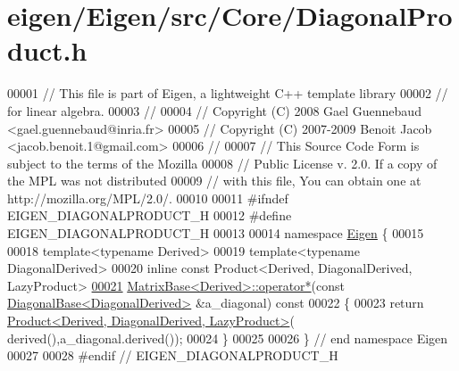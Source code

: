 \hypertarget{eigen_2_eigen_2src_2_core_2_diagonal_product_8h_source}{}\section{eigen/\+Eigen/src/\+Core/\+Diagonal\+Product.h}
\label{eigen_2_eigen_2src_2_core_2_diagonal_product_8h_source}

\begin{DoxyCode}
00001 \textcolor{comment}{// This file is part of Eigen, a lightweight C++ template library}
00002 \textcolor{comment}{// for linear algebra.}
00003 \textcolor{comment}{//}
00004 \textcolor{comment}{// Copyright (C) 2008 Gael Guennebaud <gael.guennebaud@inria.fr>}
00005 \textcolor{comment}{// Copyright (C) 2007-2009 Benoit Jacob <jacob.benoit.1@gmail.com>}
00006 \textcolor{comment}{//}
00007 \textcolor{comment}{// This Source Code Form is subject to the terms of the Mozilla}
00008 \textcolor{comment}{// Public License v. 2.0. If a copy of the MPL was not distributed}
00009 \textcolor{comment}{// with this file, You can obtain one at http://mozilla.org/MPL/2.0/.}
00010 
00011 \textcolor{preprocessor}{#ifndef EIGEN\_DIAGONALPRODUCT\_H}
00012 \textcolor{preprocessor}{#define EIGEN\_DIAGONALPRODUCT\_H}
00013 
00014 \textcolor{keyword}{namespace }\hyperlink{namespace_eigen}{Eigen} \{ 
00015 
00018 \textcolor{keyword}{template}<\textcolor{keyword}{typename} Derived>
00019 \textcolor{keyword}{template}<\textcolor{keyword}{typename} DiagonalDerived>
00020 \textcolor{keyword}{inline} \textcolor{keyword}{const} Product<Derived, DiagonalDerived, LazyProduct>
\hyperlink{group___core___module_ac896f64cf3061d07df55bbb048fb677e}{00021} \hyperlink{group___core___module_ae2d220efbf7047f0894787888288cfcc}{MatrixBase<Derived>::operator*}(\textcolor{keyword}{const} 
      \hyperlink{class_eigen_1_1_diagonal_base}{DiagonalBase<DiagonalDerived>} &a\_diagonal)\textcolor{keyword}{ const}
00022 \textcolor{keyword}{}\{
00023   \textcolor{keywordflow}{return} \hyperlink{group___core___module_class_eigen_1_1_product}{Product<Derived, DiagonalDerived, LazyProduct>}(
      derived(),a\_diagonal.derived());
00024 \}
00025 
00026 \} \textcolor{comment}{// end namespace Eigen}
00027 
00028 \textcolor{preprocessor}{#endif // EIGEN\_DIAGONALPRODUCT\_H}
\end{DoxyCode}
